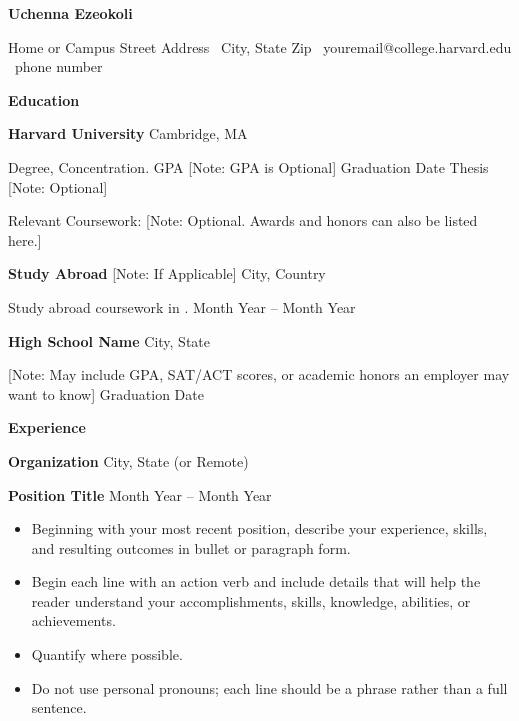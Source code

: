 \documentclass[11pt]{article}
\begin{document}
\begin{center}
    \textbf{Uchenna Ezeokoli}\\ 
    \hrulefill
\end{center}

\begin{center}
    Home or Campus Street Address \textbullet \ City, State Zip \textbullet \ youremail@college.harvard.edu \textbullet \ phone number
\end{center}

\vspace{0.5pt}

\begin{center}
    \textbf{Education}
\end{center}
\textbf{Harvard University} \hfill Cambridge, MA

Degree, Concentration. GPA [Note: GPA is Optional] \hfill Graduation Date Thesis [Note: Optional]

Relevant Coursework: [Note: Optional. Awards and honors can also be listed here.]

\vspace{12pt}

\textbf{Study Abroad} [Note: If Applicable] \hfill City, Country

Study abroad coursework in   . \hfill	Month Year – Month Year

\vspace{12pt}

\textbf{High School Name} \hfill	City, State

[Note: May include GPA, SAT/ACT scores, or academic honors an employer may want to know] \hfill Graduation Date

\vspace{12pt}

\begin{center}
    \textbf{Experience}
\end{center}
\textbf{Organization} \hfill City, State (or Remote)
 
\textbf{Position Title} \hfill Month Year – Month Year
\begin{itemize}[noitemsep]
    \item Beginning with your most recent position, describe your experience, skills, and resulting outcomes in bullet or paragraph form.
    \item Begin each line with an action verb and include details that will help the reader understand your accomplishments, skills, knowledge, abilities, or achievements.
    \item Quantify where possible.
    \item Do not use personal pronouns; each line should be a phrase rather than a full sentence.
\end{itemize}
\end{document}
